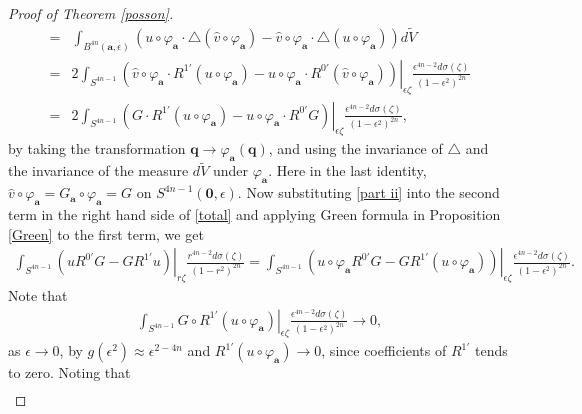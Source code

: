 \documentclass[a4paper,11pt]{amsart}
\numberwithin{equation}{section}
\begin{document}
\begin{proof}[Proof of Theorem \ref{posson}]
\begin{equation}
\begin{aligned}
=&\int_{B^{4n}(\mathbf{a},\epsilon)}\left(u\circ\varphi_{\mathbf{a}}\cdot\triangle (\widehat{v}\circ\varphi_{\mathbf{a}})-\widehat{v}\circ\varphi_{\mathbf{a}}\cdot\triangle (u\circ\varphi_{\mathbf{a}})\right) d\widetilde{V}\\
=&2\int_{S^{4n-1}}\left.\left(\widehat{v}\circ\varphi_{\mathbf{a}}\cdot R^{1'}(u\circ\varphi_{\mathbf{a}})-u\circ\varphi_{\mathbf{a}}\cdot R^{0'}(\widehat{v}\circ\varphi_{\mathbf{a}})\right)\right|_{\epsilon\zeta}\frac{\epsilon^{4n-2}d\sigma(\zeta)}{(1-\epsilon^2)^{2n}}\\
=&2\int_{S^{4n-1}}\left.\left(G\cdot R^{1'}(u\circ\varphi_{\mathbf{a}})-u\circ\varphi_{\mathbf{a}}\cdot R^{0'}G\right)\right|_{\epsilon\zeta}\frac{\epsilon^{4n-2}d\sigma(\zeta)}{(1-\epsilon^2)^{2n}},
\end{aligned}\end{equation}
by taking the transformation $\mathbf{q}\rightarrow \varphi_{\mathbf{a}}(\mathbf{q})$, and using the invariance of $\triangle$ and the invariance of the measure $d\widetilde{V}$ under $\varphi_{\mathbf{a}}$. Here in the last identity, $\widehat{v}\circ\varphi_{\mathbf{a}}=G_{\mathbf{a}}\circ\varphi_{\mathbf{a}}=G$ on $S^{4n-1}(\mathbf{0},\epsilon)$.
Now substituting \eqref{part ii} into the second term in the right hand side of \eqref{total} and applying Green formula in Proposition \ref{Green} to the first term, we get
\begin{equation*}\begin{aligned}
\int_{S^{4n-1}}\left.(uR^{0'}G-G R^{1'}u)\right|_{r\zeta}\frac{r^{4n-2}d\sigma(\zeta)}{(1-r^2)^{2n}}
=\int_{S^{4n-1}}\left.\left(u\circ\varphi_{\mathbf{a}} R^{0'}G -G R^{1'}(u\circ\varphi_{\mathbf{a}})\right)\right|_{\epsilon\zeta}\frac{\epsilon^{4n-2}d\sigma(\zeta)}{(1-\epsilon^2)^{2n}}.
\end{aligned}\end{equation*}
Note that
\begin{equation*}\begin{aligned}
\int_{S^{4n-1}}\left.G\circ R^{1'}(u\circ\varphi_{\mathbf{a}})\right|_{\epsilon\zeta}\frac{\epsilon^{4n-2}d\sigma(\zeta)}{(1-\epsilon^2)^{2n}}\rightarrow 0,
\end{aligned}\end{equation*}
as $\epsilon\rightarrow 0$, by $g(\epsilon^2)\approx \epsilon^{2-4n}$ and $R^{1'}(u\circ\varphi_{\mathbf{a}})\rightarrow 0$, since coefficients of $R^{1'}$ tends to zero. Noting that
\begin{equation*}\begin{aligned}

\end{aligned}
\end{equation*}
\end{proof}
\end{document}
